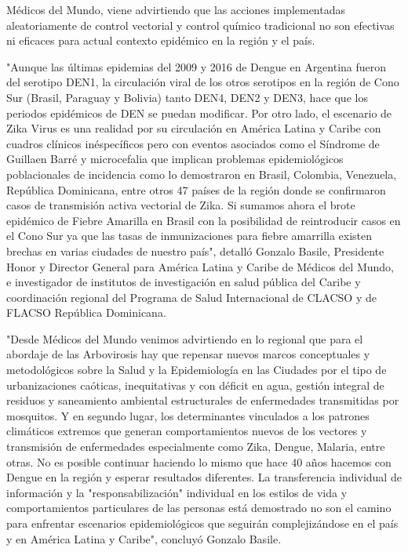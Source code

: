 Médicos del Mundo, viene advirtiendo que las acciones implementadas aleatoriamente
de control vectorial y control químico tradicional no son efectivas ni eficaces
para actual contexto epidémico en la región y el país.




"Aunque las últimas epidemias del 2009 y 2016 de Dengue en Argentina fueron del
serotipo DEN1, la circulación viral de los otros serotipos en la región de
Cono Sur (Brasil, Paraguay y Bolivia) tanto DEN4, DEN2 y DEN3, hace que los
periodos epidémicos de DEN se puedan modificar. Por otro lado, el escenario de
Zika Virus es una realidad por su circulación en América Latina y Caribe con
cuadros clínicos inéspecíficos pero con eventos asociados como el Síndrome de
Guillaen Barré y microcefalia que implican problemas epidemiológicos
poblacionales de incidencia como lo demostraron en Brasil, Colombia, Venezuela,
República Dominicana, entre otros 47 países de la región donde se confirmaron
casos de transmisión activa vectorial de Zika.
Si sumamos ahora el brote epidémico de Fiebre Amarilla en Brasil con la
posibilidad de reintroducir casos en el Cono Sur ya que las tasas de
inmunizaciones para fiebre amarrilla existen brechas en varias ciudades de nuestro país",
detalló Gonzalo Basile, Presidente Honor y Director General para
América Latina y Caribe de Médicos del Mundo, e investigador de institutos de
investigación en salud pública del Caribe y coordinación regional del Programa
de Salud Internacional de CLACSO y de FLACSO República Dominicana.





"Desde Médicos del Mundo venimos advirtiendo en lo regional que para el abordaje
de las Arbovirosis hay que repensar nuevos marcos conceptuales y metodológicos
sobre la Salud y la Epidemiología en las Ciudades por el tipo de urbanizaciones
caóticas, inequitativas y con déficit en agua, gestión integral de residuos y
saneamiento ambiental estructurales de enfermedades transmitidas por mosquitos.
Y en segundo lugar, los determinantes vinculados a los patrones climáticos
extremos que generan comportamientos nuevos de los vectores y transmisión de
enfermedades especialmente como Zika, Dengue, Malaria, entre otras.
No es posible continuar haciendo lo mismo que hace 40 años hacemos con Dengue en
la región y esperar resultados diferentes. La transferencia individual de
información y la "responsabilización" individual en los estilos de vida y
comportamientos particulares de las personas está demostrado no son el camino
para enfrentar escenarios epidemiológicos que seguirán complejizándose en el país
y en América Latina y Caribe", concluyó Gonzalo Basile.






